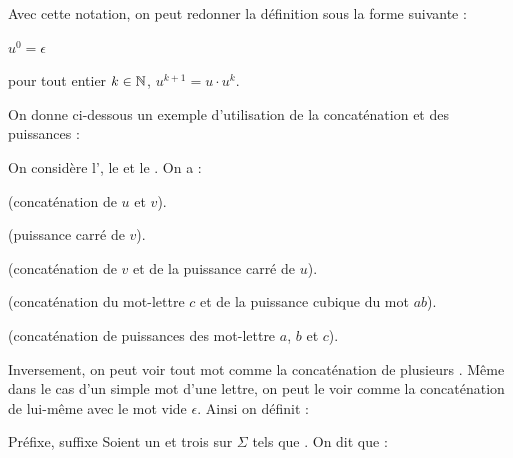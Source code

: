 \documentclass[a4paper,french,bookmarks]{book}
\begin{document}
    Avec cette notation, on peut redonner la définition sous la forme suivante :
    \begin{enumerate}
        \begin{minipage}{0.5\linewidth}
            \itt $u^0 = \epsilon$
        \end{minipage}
        \begin{minipage}{0.5\linewidth}
            \itt pour tout entier $k \in \mathbb{N}$, $u^{k+1} = u \cdot u^k$.
        \end{minipage}
    \end{enumerate}
    
    On donne ci-dessous un exemple d'utilisation de la concaténation et des puissances :
    
    \begin{example}{}{}
        On considère l', le  et le . On a :
        \begin{enumerate}
            \itt {} (concaténation de $u$ et $v$).
            
            \itt {} (puissance carré de $v$).
            
            \itt {} (concaténation de $v$ et de la puissance carré de $u$).
            
            \itt {} (concaténation du mot-lettre $c$ et de la puissance cubique du mot $ab$).
            
            \itt {} (concaténation de puissances des mot-lettre $a$, $b$ et $c$).
        \end{enumerate}
    \end{example}
    
    Inversement, on peut voir tout mot comme la concaténation de plusieurs . Même dans le cas d'un simple mot d'une lettre, on peut le voir comme la concaténation de lui-même avec le mot vide $\epsilon$. Ainsi on définit : 
    
    \begin{definition}{Préfixe, suffixe}{}
        Soient \hg{$\Sigma$} un  et trois  sur $\Sigma$ tels que . On dit que :
        \begin{enumerate}
            \begin{minipage}{0.5\linewidth}
                \itast {}
            \end{minipage}
            \begin{minipage}{0.5\linewidth}
                \itast {}
            \end{minipage}
        \end{enumerate}
    \end{definition}
    
\end{document}
